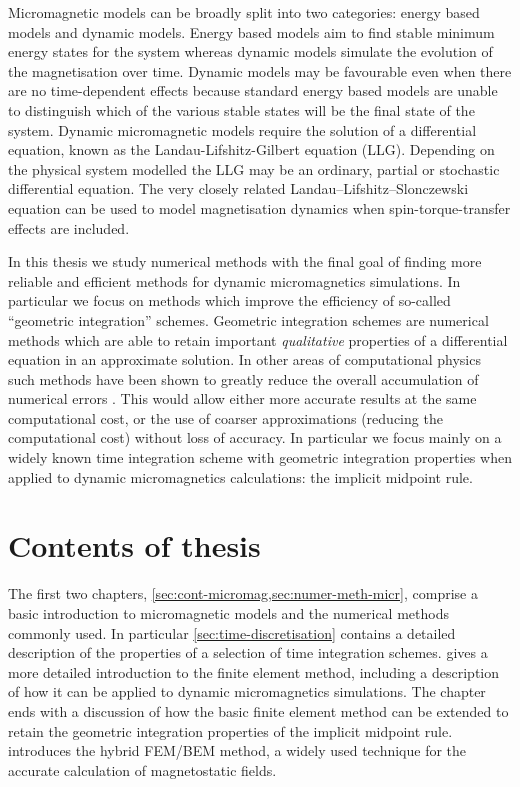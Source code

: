 Micromagnetic models can be broadly split into two categories: energy based models and dynamic models.
Energy based models aim to find stable minimum energy states for the system whereas
dynamic models simulate the evolution of the magnetisation over time.
Dynamic models may be favourable even when there are no time-dependent effects because standard energy based models are unable to distinguish which of the various stable states will be the final state of the system.
Dynamic micromagnetic models require the solution of a differential equation, known as the Landau-Lifshitz-Gilbert equation (LLG).
Depending on the physical system modelled the LLG may be an ordinary, partial or stochastic differential equation.
The very closely related Landau–Lifshitz–Slonczewski equation can be used to model magnetisation dynamics when spin-torque-transfer effects are included.


In this thesis we study numerical methods with the final goal of finding more reliable and efficient methods for dynamic micromagnetics simulations.
In particular we focus on methods which improve the efficiency of so-called ``geometric integration'' schemes.
Geometric integration schemes are numerical methods which are able to retain important \emph{qualitative} properties of a differential equation in an approximate solution.
In other areas of computational physics such methods have been shown to greatly reduce the overall accumulation of numerical errors \cite[77]{Iserles2009}.
This would allow either more accurate results at the same computational cost, or the use of coarser approximations (reducing the computational cost) without loss of accuracy.
In particular we focus mainly on a widely known time integration scheme with geometric integration properties when applied to dynamic micromagnetics calculations: the implicit midpoint rule.



\section{Contents of thesis}

The first two chapters, \cref{sec:cont-micromag,sec:numer-meth-micr}, comprise a basic introduction to micromagnetic models and the numerical methods commonly used.
In particular \cref{sec:time-discretisation} contains a detailed description of the properties of a selection of time integration schemes.
 gives a more detailed introduction to the finite element method, including a description of how it can be applied to dynamic micromagnetics simulations.
The chapter ends with a discussion of how the basic finite element method can be extended to retain the geometric integration properties of the implicit midpoint rule.
 introduces the hybrid FEM/BEM method, a widely used technique for the accurate calculation of magnetostatic fields.

